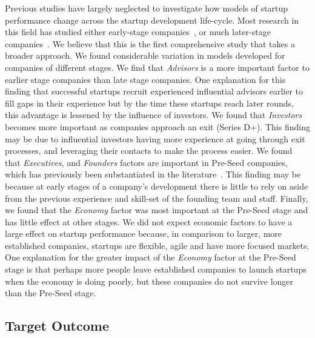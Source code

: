 \documentclass[../thesis/thesis.tex]{subfiles}
\begin{document}
Previous studies have largely neglected to investigate how models of startup performance change across the startup development life-cycle. Most research in this field has studied either early-stage companies~\cite{beckwith2016,stone2014,yuan2016,ahlers2015}, or much later-stage companies~\cite{bhat2011}. We believe that this is the first comprehensive study that takes a broader approach. We found considerable variation in models developed for companies of different stages. We find that \emph{Advisors} is a more important factor to earlier stage companies than late stage companies. One explanation for this finding that successful startups recruit experienced influential advisors earlier to fill gaps in their experience but by the time these startups reach later rounds, this advantage is lessened by the influence of investors. We found that \emph{Investors} becomes more important as companies approach an exit (Series D+). This finding may be due to influential investors having more experience at going through exit processes, and leveraging their contacts to make the process easier. We found that \emph{Executives}, and \emph{Founders} factors are important in Pre-Seed companies, which has previously been substantiated in the literature~\cite{beckwith2016,an2015}. This finding may be because at early stages of a company's development there is little to rely on aside from the previous experience and skill-set of the founding team and staff. Finally, we found that the \emph{Economy} factor was most important at the Pre-Seed stage and has little effect at other stages. We did not expect economic factors to have a large effect on startup performance because, in comparison to larger, more established companies, startups are flexible, agile and have more focused markets. One explanation for the greater impact of the \emph{Economy} factor at the Pre-Seed stage is that perhaps more people leave established companies to launch startups when the economy is doing poorly, but these companies do not survive longer than the Pre-Seed stage.

\subsection{Target Outcome}
\end{document}
